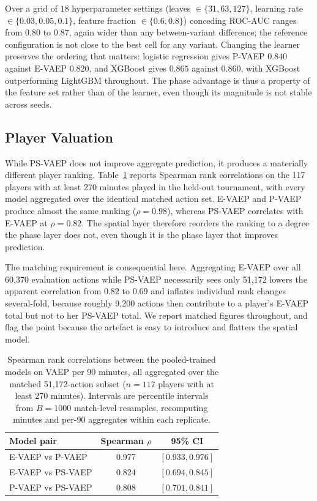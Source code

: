 \documentclass[runningheads]{llncs}
\begin{document}
Over a grid of $18$ hyperparameter settings (leaves $\in \{31, 63, 127\}$, learning rate $\in \{0.03, 0.05, 0.1\}$, feature fraction $\in \{0.6, 0.8\}$) conceding ROC-AUC ranges from $0.80$ to $0.87$, again wider than any between-variant difference; the reference configuration is not close to the best cell for any variant. Changing the learner preserves the ordering that matters: logistic regression gives P-VAEP $0.840$ against E-VAEP $0.820$, and XGBoost gives $0.865$ against $0.860$, with XGBoost outperforming LightGBM throughout. The phase advantage is thus a property of the feature set rather than of the learner, even though its magnitude is not stable across seeds.



\subsection{Player Valuation}
\label{sec:players}

While PS-VAEP does not improve aggregate prediction, it produces a materially different player ranking. Table~\ref{tab:ranks} reports Spearman rank correlations on the 117 players with at least 270 minutes played in the held-out tournament, with every model aggregated over the identical matched action set. E-VAEP and P-VAEP produce almost the same ranking ($\rho = 0.98$), whereas PS-VAEP correlates with E-VAEP at $\rho = 0.82$. The spatial layer therefore reorders the ranking to a degree the phase layer does not, even though it is the phase layer that improves prediction.

The matching requirement is consequential here. Aggregating E-VAEP over all 60{,}370 evaluation actions while PS-VAEP necessarily sees only 51{,}172 lowers the apparent correlation from $0.82$ to $0.69$ and inflates individual rank changes several-fold, because roughly 9{,}200 actions then contribute to a player's E-VAEP total but not to her PS-VAEP total. We report matched figures throughout, and flag the point because the artefact is easy to introduce and flatters the spatial model.

\begin{table}[tbp]
\footnotesize
\centering
\caption{Spearman rank correlations between the pooled-trained models on VAEP per 90 minutes, all aggregated over the matched 51{,}172-action subset ($n = 117$ players with at least 270 minutes). Intervals are percentile intervals from $B = 1000$ match-level resamples, recomputing minutes and per-90 aggregates within each replicate.\label{tab:ranks}}
\begin{tabular}{lcc}
\toprule
\textbf{Model pair} & \textbf{Spearman $\rho$} & \textbf{95\% CI} \\
\midrule
E-VAEP vs P-VAEP & 0.977 & $[0.933, 0.976]$ \\
E-VAEP vs PS-VAEP & 0.824 & $[0.694, 0.845]$ \\
P-VAEP vs PS-VAEP & 0.808 & $[0.701, 0.841]$ \\
\bottomrule
\end{tabular}
\end{table}
\end{document}
